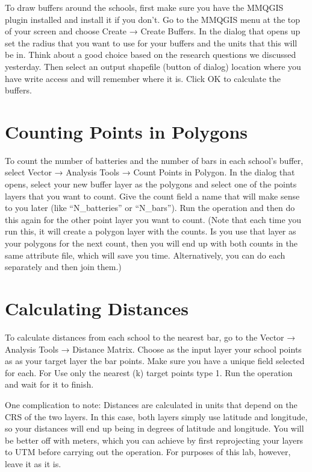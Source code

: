 \documentclass[]{book}
\begin{document}
To draw buffers around the schools, first make sure you have the MMQGIS plugin installed and install it if you don't. Go to the MMQGIS menu at the top of your screen and choose Create → Create Buffers. In the dialog that opens up set the radius that you want to use for your buffers and the units that this will be in. Think about a good choice based on the research questions we discussed yesterday. Then select an output shapefile (button of dialog) location where you have write access and will remember where it is. Click OK to calculate the buffers.

\hypertarget{counting-points-in-polygons}{%
\section{Counting Points in Polygons}\label{counting-points-in-polygons}}

To count the number of batteries and the number of bars in each school's buffer, select Vector → Analysis Tools → Count Points in Polygon. In the dialog that opens, select your new buffer layer as the polygons and select one of the points layers that you want to count. Give the count field a name that will make sense to you later (like ``N\_batteries'' or ``N\_bars''). Run the operation and then do this again for the other point layer you want to count. (Note that each time you run this, it will create a polygon layer with the counts. Is you use that layer as your polygons for the next count, then you will end up with both counts in the same attribute file, which will save you time. Alternatively, you can do each separately and then join them.)

\hypertarget{calculating-distances}{%
\section{Calculating Distances}\label{calculating-distances}}

To calculate distances from each school to the nearest bar, go to the Vector → Analysis Tools → Distance Matrix. Choose as the input layer your school points as as your target layer the bar points. Make sure you have a unique field selected for each. For Use only the nearest (k) target points type 1. Run the operation and wait for it to finish.

One complication to note: Distances are calculated in units that depend on the CRS of the two layers. In this case, both layers simply use latitude and longitude, so your distances will end up being in degrees of latitude and longitude. You will be better off with meters, which you can achieve by first reprojecting your layers to UTM before carrying out the operation. For purposes of this lab, however, leave it as it is.
\end{document}
